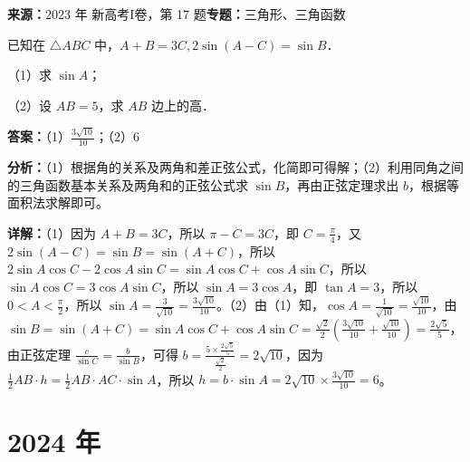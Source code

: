 \begin{question}[points=10]
\textbf{来源：}2023 年 新高考I卷，第 17 题\quad \textbf{专题：}三角形、三角函数\par
已知在 $\triangle ABC$ 中，$A+B=3C, 2\sin(A-C)=\sin B$．

（1）求 $\sin A$；

（2）设 $AB=5$，求 $AB$ 边上的高．
\begin{solution}
\textbf{答案：}（1）$\frac{3\sqrt{10}}{10}$；（2）6

\textbf{分析：}（1）根据角的关系及两角和差正弦公式，化简即可得解；（2）利用同角之间的三角函数基本关系及两角和的正弦公式求 $\sin B$，再由正弦定理求出 $b$，根据等面积法求解即可。

\textbf{详解：}（1）因为 $A+B=3C$，所以 $\pi-C=3C$，即 $C=\frac{\pi}{4}$，又 $2\sin(A-C)=\sin B=\sin(A+C)$，所以 $2\sin A\cos C-2\cos A\sin C=\sin A\cos C+\cos A\sin C$，所以 $\sin A\cos C=3\cos A\sin C$，所以 $\sin A=3\cos A$，即 $\tan A=3$，所以 $0<A<\frac{\pi}{2}$，所以 $\sin A=\frac{3}{\sqrt{10}}=\frac{3\sqrt{10}}{10}$。（2）由（1）知，$\cos A=\frac{1}{\sqrt{10}}=\frac{\sqrt{10}}{10}$，由 $\sin B=\sin(A+C)=\sin A\cos C+\cos A\sin C=\frac{\sqrt{2}}{2}(\frac{3\sqrt{10}}{10}+\frac{\sqrt{10}}{10})=\frac{2\sqrt{5}}{5}$，由正弦定理 $\frac{c}{\sin C}=\frac{b}{\sin B}$，可得 $b=\frac{5\times\frac{2\sqrt{5}}{5}}{\frac{\sqrt{2}}{2}}=2\sqrt{10}$，因为 $\frac{1}{2}AB\cdot h=\frac{1}{2}AB\cdot AC\cdot\sin A$，所以 $h=b\cdot\sin A=2\sqrt{10}\times\frac{3\sqrt{10}}{10}=6$。
\end{solution}
\end{question}

\section*{2024 年}

